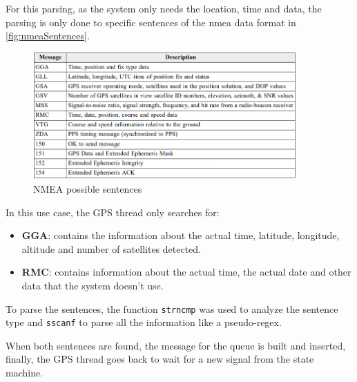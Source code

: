 For this parsing, as the system only needs the location, time and data, the parsing is only done to specific sentences of the \acrshort{nmea} data format in \autoref{fig:nmeaSentences}.
\begin{figure}[H]
    \centering
    \includegraphics[width=0.9\textwidth]{images/4/nmea.png}
    \caption{NMEA possible sentences\cite{NMEAReferenceManual}}
    \label{fig:nmeaSentences}
\end{figure}
In this use case, the GPS thread only searches for:
\begin{itemize}
    \item \textbf{GGA}: contains the information about the actual time, latitude, longitude, altitude and number of satellites detected.
    \item \textbf{RMC}: contains information about the actual time, the actual date and other data that the system doesn't use.
\end{itemize}
To parse the sentences, the function \texttt{strncmp} was used to analyze the sentence type and \texttt{sscanf} to parse all the information like a pseudo-regex.

When both sentences are found, the message for the queue is built and inserted, finally, the GPS thread goes back to wait for a new signal from the state machine.

\clearpage
